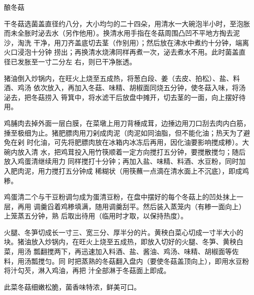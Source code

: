 \begin{recipe}{酿冬菇}

\ingredients


\preparation

\step 干冬菇选菌盖直径约八分，大小均匀的二十四朵，用清水一大碗泡半小时，至泡胀
而未全胀时泌去水（另作他用）。换清水用手指在冬菇周围凸凹不平地方掏去泥沙，淘洗
干净，用刀齐盖底切去茎（作别用）；然后放在沸水中煮约十分钟，端离火口浸泡十分钟
捞出；再换清水烧沸同样再煮一次，泌去煮水不用。此时菌盖直径已发胀至一寸二分左
右，则已干净胀透。

猪油倒入炒锅内，在旺火上烧至五成热，将葱白段、姜（去皮、拍松）、盐、料酒、鸡汤
依次放入，再加入冬菇、味精、胡椒面同烧五分钟，使冬菇入味，将汤泌去，把冬菇捞入
筲箕中，将水滤干后放盘中摊开，切去茎的一面，向上摆好待用。

\step 鸡脯肉去掉外面一层白膜，在菜墩上用刀背棰成茸，边捶边用刀口刮去肉内白筋，
捶至极细为止。猪肥膘肉用刀剁成肉泥（肉泥如同油脂，但不能化油；热天为了避免在剁
时化油，可先将肥膘肉放在冰箱内冰冻后再用，因化油要影响搅成糁）。大碗内放入清
水，把鸡茸投入用竹筷顺着一定方向搅打五分钟，要搅散搅匀；随后放入鸡蛋清继续用力
同样搅打十分钟；再加入盐、味精、料酒、水豆粉，同时加入肥肉泥，用力搅打五分钟成
稀糊状（用筷蘸一点滴在清水面上不沉底），即成鸡糁。

鸡蛋清二个与干豆粉调匀成为蛋清豆粉，在盘中摆好的每个冬菇上的凹处抹上一层，再用
调羹舀着鸡糁填满，随用调羹刮平。然后装入蒸笼内（有糁一面向上）上笼蒸五分钟，熟
后取出待用（临用时才取，以保持热度）。

\step 火腿、冬笋切成长一寸三、宽三分、厚半分的片。黄秧白菜心切成一寸半大小的
块。猪油放入炒锅内，在旺火上烧至五成热，即放入切好的火腿、冬笋、黄秧白菜，用汤
瓢翻搅两下，再迅速加入料酒、盐、酱油、鸡汤、味精、胡椒面等佐料，用汤瓢搅匀。同
时把蒸熟的冬菇翻入盘内（要使冬菇盖顶向上），即用水豆粉将汁勾芡，淋入鸡油，再把
汁全部淋于冬菇面上即成。

\features

此菜冬菇细嫩松脆，菌香味特浓，鲜美可口。

\end{recipe}

